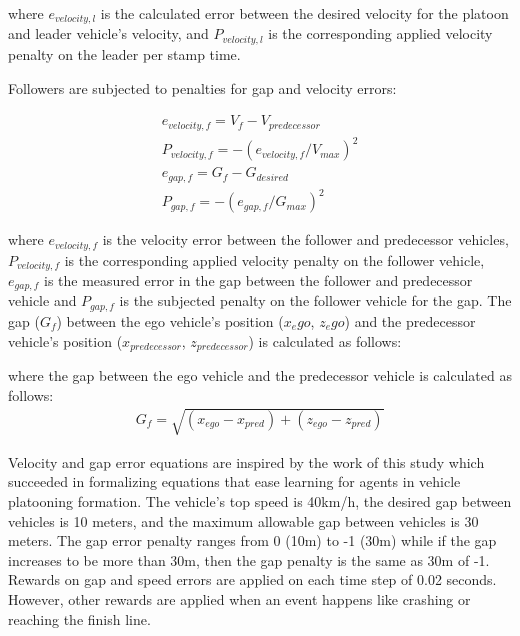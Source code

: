 where $e_{velocity,l}$ is the calculated error between the desired velocity for the platoon and leader vehicle’s velocity, and $P_{velocity,l}$ is the corresponding applied velocity penalty on the leader per stamp time.

Followers are subjected to penalties for gap and velocity errors:

\begin{gather}
e_{velocity,f} = V_f - V_{predecessor} \\
P_{velocity,f} = -(e_{velocity,f}/V_{max})^2\\
e_{gap,f} = G_f - G_{desired}\\
P_{gap,f} = -(e_{gap,f}/G_{max})^2
\end{gather}

where $e_{velocity,f}$ is the velocity error between the follower and predecessor vehicles, $P_{velocity,f}$ is the corresponding applied velocity penalty on the follower vehicle, $e_{gap,f}$ is the measured error in the gap between the follower and predecessor vehicle and $P_{gap,f}$ is the subjected penalty on the follower vehicle for the gap.
The gap ($G_f$) between the ego vehicle’s position ($x_ego$, $z_ego$) and the predecessor vehicle’s position ($x_{predecessor}$, $z_{predecessor}$) is calculated as follows:


where the gap between the ego vehicle and the predecessor vehicle is calculated as follows:
\begin{gather}
G_f = \sqrt{(x_{ego} - x_{pred}) + (z_{ego} - z_{pred})}
\end{gather}

Velocity and gap error equations are inspired by the work of this study \cite{faragreinforcement} which succeeded in formalizing equations that ease learning for agents in vehicle platooning formation. The vehicle's top speed is 40km/h, the desired gap between vehicles is 10 meters, and the maximum allowable gap between vehicles is 30 meters. The gap error penalty ranges from 0 (10m) to -1 (30m) while if the gap increases to be more than 30m, then the gap penalty is the same as 30m of -1. Rewards on gap and speed errors are applied on each time step of 0.02 seconds. However, other rewards are applied when an event happens like crashing or reaching the finish line.
